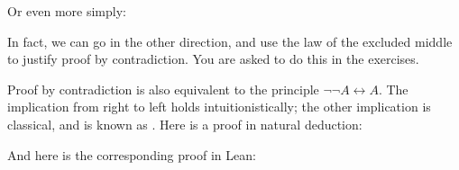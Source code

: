 \documentclass[letterpaper,10pt,english]{sphinxmanual}
\begin{document}
\begin{sphinxVerbatim}[commandchars=\\\{\}]
 

         
  
        
         
\end{sphinxVerbatim}

\sphinxAtStartPar
Or even more simply:

\begin{sphinxVerbatim}[commandchars=\\\{\}]
 

         
 

\end{sphinxVerbatim}

\sphinxAtStartPar
In fact, we can go in the other direction,
and use the law of the excluded middle to justify proof by contradiction.
You are asked to do this in the exercises.

\sphinxAtStartPar
Proof by contradiction is also equivalent to the principle
\(\neg \neg A \leftrightarrow A\).
The implication from right to left holds intuitionistically;
the other implication is classical,
and is known as .
Here is a proof in natural deduction:



\begin{center}
\AXM{}
\AXM{}
\BIM{\bot}
\AXM{}
\AXM{}
\BIM{\bot}
\DP
\end{center}

\sphinxAtStartPar
And here is the corresponding proof in Lean:
\end{document}
